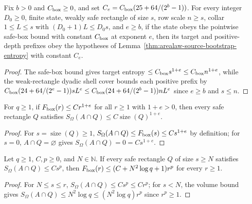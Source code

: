 \begin{lemma}
    \label{thm:arealaw-weak-rectangle-source-entropy}
    \leanok
    Fix $b>0$ and $C_{\rm box}\geq0$, and set $C_e=C_{\rm box}(25+64/(2^b-1))$.
    For every integer $D_0\geq0$, finite state, weakly safe rectangle of size $s$,
    row scale $n\geq s$, collar $1\leq L\leq s$ with $(D_0+1)L\leq D_0s$, and $e\geq b$,
    if the state obeys the pointwise safe-box bound with constant $C_{\rm box}$ at exponent $e$,
    then its target and positive-depth prefixes obey the hypotheses of
    Lemma~\ref{thm:arealaw-source-bootstrap-entropy} with constant $C_e$.
\end{lemma}
\begin{proof}
    \leanok
    The safe-box bound gives target entropy $\le C_{\rm box}s^{1+e}\le C_{\rm box}n^{1+e}$,
    while the weak-rectangle dyadic shell cover bounds each positive prefix by
    $C_{\rm box}(24+64/(2^e-1))sL^e\le C_{\rm box}(24+64/(2^b-1))nL^e$ since $e\ge b$ and $s\le n$.
\end{proof}


\begin{lemma}
    \label{thm:arealaw-box-supremum-powers}
    \leanok
    For $q\geq1$, if $F_{\rm box}(r)\le Cr^{1+e}$ for all $r\ge1$ with $1+e>0$, then every
    safe rectangle $Q$ satisfies $S_\Omega(A\cap Q)\le C\operatorname{size}(Q)^{1+e}$.
\end{lemma}
\begin{proof}
    \leanok
    For $s=\operatorname{size}(Q)\ge1$, $S_\Omega(A\cap Q)\le F_{\rm box}(s)\le Cs^{1+e}$ by definition;
    for $s=0$, $A\cap Q=\varnothing$ gives $S_\Omega(A\cap Q)=0=Cs^{1+e}$.
\end{proof}

\begin{lemma}
    \label{thm:arealaw-box-supremum-small-sizes}
    \leanok
    Let $q\geq1$, $C,p\geq0$, and $N\in\mathbb N$. If every safe rectangle $Q$ of size
    $s\geq N$ satisfies $S_\Omega(A\cap Q)\le Cs^p$, then
    $F_{\rm box}(r)\le(C+N^2\log q+1)r^p$ for every $r\geq1$.
\end{lemma}
\begin{proof}
    \leanok
    For $N\le s\le r$, $S_\Omega(A\cap Q)\le Cs^p\le Cr^p$; for $s<N$, the volume bound gives
    $S_\Omega(A\cap Q)\le N^2\log q\le(N^2\log q)r^p$ since $r^p\ge1$.
\end{proof}


